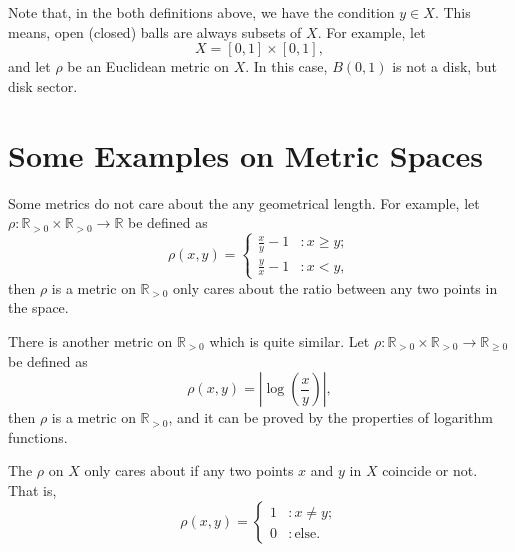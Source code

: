 \documentclass{report}
\begin{document}
Note that, in the both definitions above, we have the condition $y \in X$. This means, open (closed) balls are always subsets of $X$. For example, let
$$
X = [0 , 1] \times [0,1],
$$
and let $\rho$ be an Euclidean metric on $X$. In this case, $B(0,1)$ is not a disk, but disk sector.


\section{Some Examples on Metric Spaces}


\begin{example}
	Some metrics do not care about the any geometrical length. For example, let $\rho: \mathbb R_{> 0} \times \mathbb R_{> 0} \to \mathbb R$ be defined as
	$$
	\rho(x,y) =
	\begin{cases}
	\displaystyle \frac{x}{y} - 1 &: x \ge y; \\
	\displaystyle \frac{y}{x} - 1 &: x < y,
	\end{cases}
	$$
	then $\rho$ is a metric on $\mathbb R_{> 0}$ only cares about the ratio between any two points in the space.
	
	There is another metric on $\mathbb R_{> 0}$ which is quite similar. Let $\rho: \mathbb R_{> 0} \times \mathbb R_{> 0} \to \mathbb R_{\ge 0}$ be defined as
	$$
	\rho(x,y) = \left|\log \left( \frac{x}{y} \right) \right|,
	$$
	then $\rho$ is a metric on $\mathbb R_{> 0}$, and it can be proved by the properties of logarithm functions.
\end{example}


\begin{example}
	The  $\rho$ on $X$ only cares about if any two points $x$ and $y$ in $X$ coincide or not. That is,
	$$
	\rho(x,y) =
	\begin{cases}
	1 &: x \ne y; \\
	0 &: \text{else}.
	\end{cases}
	$$
\end{example}
\end{document}
